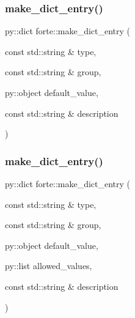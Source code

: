 \subsubsection{\texorpdfstring{make\+\_\+dict\+\_\+entry()}{make\_dict\_entry()}\hspace{0.1cm}{\footnotesize\ttfamily [1/2]}}
{\footnotesize\ttfamily py\+::dict forte\+::make\+\_\+dict\+\_\+entry (\begin{DoxyParamCaption}\item[{const std\+::string \&}]{type,  }\item[{const std\+::string \&}]{group,  }\item[{py\+::object}]{default\+\_\+value,  }\item[{const std\+::string \&}]{description }\end{DoxyParamCaption})}

\mbox{\label{namespaceforte_a66e62ab4e148d491468404a5658303d1}} 
\subsubsection{\texorpdfstring{make\+\_\+dict\+\_\+entry()}{make\_dict\_entry()}\hspace{0.1cm}{\footnotesize\ttfamily [2/2]}}
{\footnotesize\ttfamily py\+::dict forte\+::make\+\_\+dict\+\_\+entry (\begin{DoxyParamCaption}\item[{const std\+::string \&}]{type,  }\item[{const std\+::string \&}]{group,  }\item[{py\+::object}]{default\+\_\+value,  }\item[{py\+::list}]{allowed\+\_\+values,  }\item[{const std\+::string \&}]{description }\end{DoxyParamCaption})}

\mbox{\label{namespaceforte_a0e9db0f66ab09d793a02865a721fa630}} 
